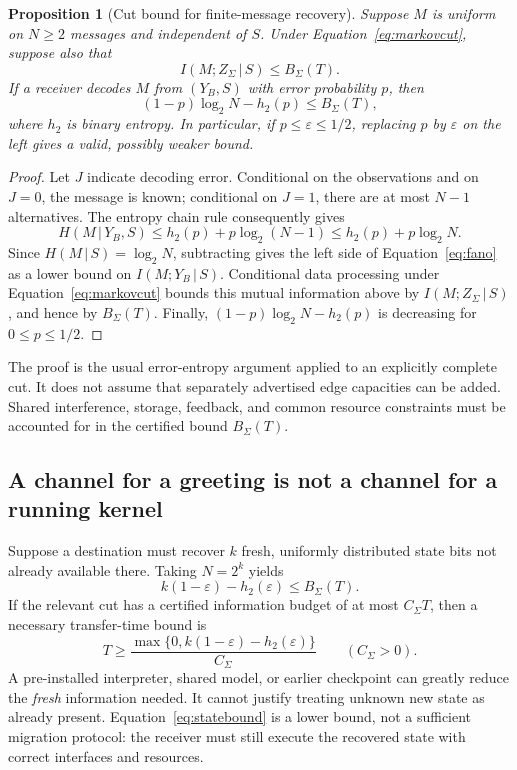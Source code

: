 \documentclass[11pt,a4paper]{article}
\newtheorem{proposition}[theorem]{Proposition}
\theoremstyle{definition}
\theoremstyle{remark}
\newcommand{\given}{\,\vert\,}
\begin{document}
\begin{proposition}[Cut bound for finite-message recovery]\label{prop:cut}
Suppose $M$ is uniform on $N\geq2$ messages and independent of $S$. Under Equation~\eqref{eq:markovcut}, suppose also that
\[
 I(M;Z_\Sigma\given S)\leq B_\Sigma(T).
\]
If a receiver decodes $M$ from $(Y_B,S)$ with error probability $p$, then
\begin{equation}\label{eq:fano}
 (1-p)\log_2N-h_2(p)\leq B_\Sigma(T),
\end{equation}
where $h_2$ is binary entropy. In particular, if $p\leq\varepsilon\leq1/2$, replacing $p$ by $\varepsilon$ on the left gives a valid, possibly weaker bound.
\end{proposition}
\begin{proof}
Let $J$ indicate decoding error. Conditional on the observations and on $J=0$, the message is known; conditional on $J=1$, there are at most $N-1$ alternatives. The entropy chain rule consequently gives
\[
 H(M\given Y_B,S)\leq h_2(p)+p\log_2(N-1)
 \leq h_2(p)+p\log_2N.
\]
Since $H(M\given S)=\log_2N$, subtracting gives the left side of Equation~\eqref{eq:fano} as a lower bound on $I(M;Y_B\given S)$. Conditional data processing under Equation~\eqref{eq:markovcut} bounds this mutual information above by $I(M;Z_\Sigma\given S)$, and hence by $B_\Sigma(T)$. Finally, $(1-p)\log_2N-h_2(p)$ is decreasing for $0\leq p\leq1/2$.
\end{proof}
The proof is the usual error-entropy argument applied to an explicitly complete cut. It does not assume that separately advertised edge capacities can be added. Shared interference, storage, feedback, and common resource constraints must be accounted for in the certified bound $B_\Sigma(T)$.

\subsection{A channel for a greeting is not a channel for a running kernel}
Suppose a destination must recover $k$ fresh, uniformly distributed state bits not already available there. Taking $N=2^k$ yields
\begin{equation}\label{eq:statebound}
 k(1-\varepsilon)-h_2(\varepsilon)\leq B_\Sigma(T).
\end{equation}
If the relevant cut has a certified information budget of at most $C_\Sigma T$, then a necessary transfer-time bound is
\begin{equation}\label{eq:timebound}
 T\geq\frac{\max\{0,k(1-\varepsilon)-h_2(\varepsilon)\}}{C_\Sigma}
 \qquad(C_\Sigma>0).
\end{equation}
A pre-installed interpreter, shared model, or earlier checkpoint can greatly reduce the \emph{fresh} information needed. It cannot justify treating unknown new state as already present. Equation~\eqref{eq:statebound} is a lower bound, not a sufficient migration protocol: the receiver must still execute the recovered state with correct interfaces and resources.
\end{document}
